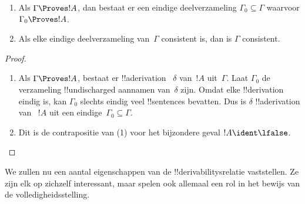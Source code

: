 \documentclass[openany]{memoir}
\begin{document}
\begin{prop}[Compactheid]
  \begin{enumerate}
  \item Als $\Gamma \Proves !A$, dan bestaat er een eindige
    deelverzameling $\Gamma_0 \subseteq \Gamma$ waarvoor
    $\Gamma_0 \Proves !A$.
  \item Als elke eindige deelverzameling van~$\Gamma$ consistent is,
    dan is $\Gamma$ consistent.
  \end{enumerate}
\end{prop}

\begin{proof}
  \begin{enumerate}
    \item Als $\Gamma \Proves !A$, bestaat er !!a{derivation}
      ~$\delta$ van~$!A$ uit~$\Gamma$. Laat $\Gamma_0$ de verzameling
      !!{undischarged} aannamen van~$\delta$ zijn. Omdat elke
      !!{derivation} eindig is, kan $\Gamma_0$ slechts eindig veel
      !!{sentence}s bevatten. Dus is $\delta$ !!a{derivation} van
      ~$!A$ uit een eindige~$\Gamma_0 \subseteq \Gamma$.
    \item Dit is de contrapositie van (1) voor het bijzondere geval
      $!A \ident \lfalse$.
  \end{enumerate}
\end{proof}
\endgroup

\begingroup
\def\olfilename{OLP-0092}
\def\olfilepath{content/first-order-logic/natural-deduction/}
\hypertarget{unit-OLP-0092}{}



      {}
      {}
      

We zullen nu een aantal eigenschappen van de
!!{derivability}srelatie vaststellen. Ze zijn elk op zichzelf
interessant, maar spelen ook allemaal een rol in het bewijs van de
volledigheidsstelling.
\end{document}

